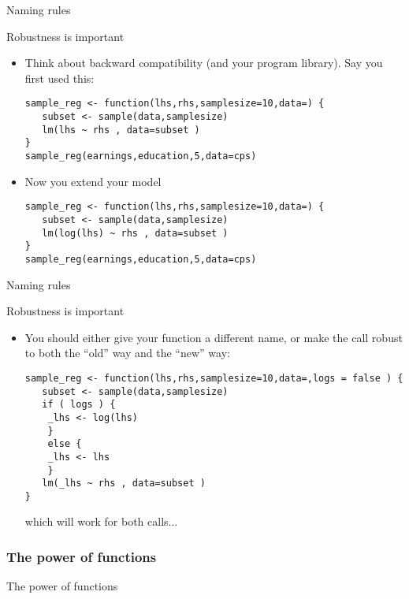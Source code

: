 \documentclass[xcolor=table,compress]{beamer}
\begin{document}
\begin{frame}[fragile]{Naming rules}
\begin{block}{Robustness is important}
\begin{itemize}[<+->]
\item Think about backward compatibility (and your program library). Say you first used this:
\begin{lstlisting}
sample_reg <- function(lhs,rhs,samplesize=10,data=) {
   subset <- sample(data,samplesize)
   lm(lhs ~ rhs , data=subset )
}
sample_reg(earnings,education,5,data=cps)
\end{lstlisting}
\item Now you extend your model
\color{red}
\begin{lstlisting}
sample_reg <- function(lhs,rhs,samplesize=10,data=) {
   subset <- sample(data,samplesize)
   lm(log(lhs) ~ rhs , data=subset )
}
sample_reg(earnings,education,5,data=cps)
\end{lstlisting}
\end{itemize}
\end{block}
\end{frame}


\begin{frame}[fragile]{Naming rules}
\begin{block}{Robustness is important}
\begin{itemize}
\item You should either give your function a different name, or make the call robust to both the ``old'' way and the ``new'' way:\color{blue}
\begin{lstlisting}
sample_reg <- function(lhs,rhs,samplesize=10,data=,logs = false ) {
   subset <- sample(data,samplesize)
   if ( logs ) {
   	_lhs <- log(lhs)
   	}
   	else {
   	_lhs <- lhs
   	}
   lm(_lhs ~ rhs , data=subset )
}
\end{lstlisting}\color{black}
which will work for both calls... 
\end{itemize}
\end{block}
\end{frame}





\subsubsection[Power]{The power of functions}
\begin{frame}
\vfill
The power of functions
\vfill
\end{frame}
\end{document}

